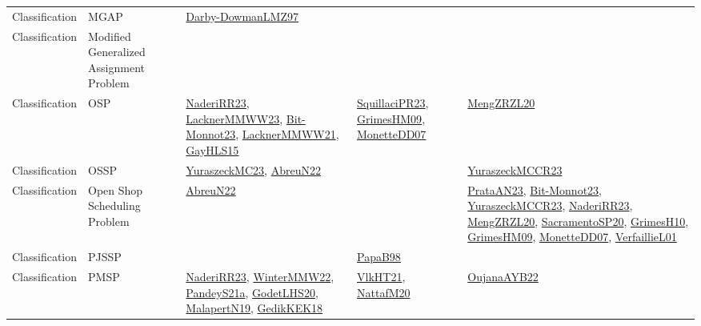 {\begin{longtable}{lp{3cm}>{\raggedright}p{6cm}>{\raggedright}p{6cm}p{8cm}}
Classification & MGAP & \href{articles/Darby-DowmanLMZ97.pdf}{Darby-DowmanLMZ97}\cite{Darby-DowmanLMZ97} &  & \\
Classification & Modified Generalized Assignment Problem &  &  & \\
Classification & OSP & \href{articles/NaderiRR23.pdf}{NaderiRR23}\cite{NaderiRR23}, \href{articles/LacknerMMWW23.pdf}{LacknerMMWW23}\cite{LacknerMMWW23}, \href{papers/Bit-Monnot23.pdf}{Bit-Monnot23}\cite{Bit-Monnot23}, \href{papers/LacknerMMWW21.pdf}{LacknerMMWW21}\cite{LacknerMMWW21}, \href{papers/GayHLS15.pdf}{GayHLS15}\cite{GayHLS15} & \href{papers/SquillaciPR23.pdf}{SquillaciPR23}\cite{SquillaciPR23}, \href{papers/GrimesHM09.pdf}{GrimesHM09}\cite{GrimesHM09}, \href{papers/MonetteDD07.pdf}{MonetteDD07}\cite{MonetteDD07} & \href{articles/MengZRZL20.pdf}{MengZRZL20}\cite{MengZRZL20}\\
Classification & OSSP & \href{papers/YuraszeckMC23.pdf}{YuraszeckMC23}\cite{YuraszeckMC23}, \href{articles/AbreuN22.pdf}{AbreuN22}\cite{AbreuN22} &  & \href{articles/YuraszeckMCCR23.pdf}{YuraszeckMCCR23}\cite{YuraszeckMCCR23}\\
Classification & Open Shop Scheduling Problem & \href{articles/AbreuN22.pdf}{AbreuN22}\cite{AbreuN22} &  & \href{articles/PrataAN23.pdf}{PrataAN23}\cite{PrataAN23}, \href{papers/Bit-Monnot23.pdf}{Bit-Monnot23}\cite{Bit-Monnot23}, \href{articles/YuraszeckMCCR23.pdf}{YuraszeckMCCR23}\cite{YuraszeckMCCR23}, \href{articles/NaderiRR23.pdf}{NaderiRR23}\cite{NaderiRR23}, \href{articles/MengZRZL20.pdf}{MengZRZL20}\cite{MengZRZL20}, \href{articles/SacramentoSP20.pdf}{SacramentoSP20}\cite{SacramentoSP20}, \href{papers/GrimesH10.pdf}{GrimesH10}\cite{GrimesH10}, \href{papers/GrimesHM09.pdf}{GrimesHM09}\cite{GrimesHM09}, \href{papers/MonetteDD07.pdf}{MonetteDD07}\cite{MonetteDD07}, \href{papers/VerfaillieL01.pdf}{VerfaillieL01}\cite{VerfaillieL01}\\
Classification & PJSSP &  & \href{articles/PapaB98.pdf}{PapaB98}\cite{PapaB98} & \\
Classification & PMSP & \href{articles/NaderiRR23.pdf}{NaderiRR23}\cite{NaderiRR23}, \href{papers/WinterMMW22.pdf}{WinterMMW22}\cite{WinterMMW22}, \href{articles/PandeyS21a.pdf}{PandeyS21a}\cite{PandeyS21a}, \href{papers/GodetLHS20.pdf}{GodetLHS20}\cite{GodetLHS20}, \href{papers/MalapertN19.pdf}{MalapertN19}\cite{MalapertN19}, \href{articles/GedikKEK18.pdf}{GedikKEK18}\cite{GedikKEK18} & \href{articles/VlkHT21.pdf}{VlkHT21}\cite{VlkHT21}, \href{papers/NattafM20.pdf}{NattafM20}\cite{NattafM20} & \href{papers/OujanaAYB22.pdf}{OujanaAYB22}\cite{OujanaAYB22}\\

\end{longtable}}
